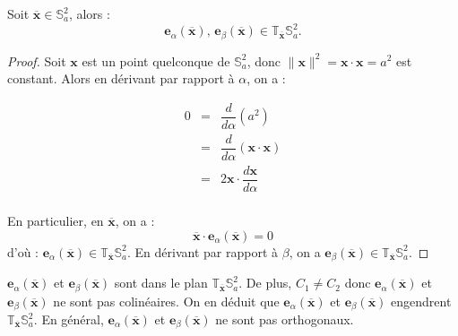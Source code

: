 \begin{proposition}
Soit $\overline{\mathbf{x}} \in \mathbb{S}_a^2$, alors :
\begin{equation}
\mathbf{e}_{\alpha}(\overline{\mathbf{x}})\text{, } \mathbf{e}_{\beta}(\overline{\mathbf{x}}) \in \mathbb{T}_{\overline{\mathbf{x}}} \mathbb{S}_a^2.
\end{equation}
\end{proposition}


\begin{proof}
Soit $\mathbf{x}$ est un point quelconque de $\mathbb{S}_a^2$, donc $\| \mathbf{x} \|^2 = \mathbf{x} \cdot \mathbf{x} = a^2$ est constant.
Alors en dérivant par rapport à $\alpha$, on a :
 
\begin{equation*}
\begin{array}{rcl}
0 & = & \dfrac{d}{d \alpha} ( a^2 )\\
  & = & \dfrac{d}{d \alpha} ( \mathbf{x} \cdot \mathbf{x} )\\
  & = & 2 \mathbf{x} \cdot \dfrac{d \mathbf{x}}{d \alpha}\\
\end{array}
\end{equation*}

En particulier, en $\overline{\mathbf{x}}$, on a :
\begin{equation}
\overline{\mathbf{x}} \cdot \mathbf{e}_{\alpha}(\overline{\mathbf{x}}) = 0
\end{equation}
d'où : $\mathbf{e}_{\alpha}(\overline{\mathbf{x}}) \in \mathbb{T}_{\overline{\mathbf{x}}} \mathbb{S}_a^2$. En dérivant par rapport à $\beta$, on a $\mathbf{e}_{\beta}(\overline{\mathbf{x}}) \in \mathbb{T}_{\overline{\mathbf{x}}} \mathbb{S}_a^2$.
\end{proof}

$\mathbf{e}_{\alpha}(\overline{\mathbf{x}})$ et $\mathbf{e}_{\beta}(\overline{\mathbf{x}})$ sont dans le plan $\mathbb{T}_{\overline{\mathbf{x}}}\mathbb{S}_a^2$. De plus, $C_1 \neq C_2$ donc $\mathbf{e}_{\alpha}(\overline{\mathbf{x}})$ et $\mathbf{e}_{\beta}(\overline{\mathbf{x}})$ ne sont pas colinéaires. On en déduit que $\mathbf{e}_{\alpha}(\overline{\mathbf{x}})$ et $\mathbf{e}_{\beta}(\overline{\mathbf{x}})$ engendrent $\mathbb{T}_{\overline{\mathbf{x}}} \mathbb{S}_a^2$. En général, $\mathbf{e}_{\alpha}(\overline{\mathbf{x}})$ et $\mathbf{e}_{\beta}(\overline{\mathbf{x}})$ ne sont pas orthogonaux.

